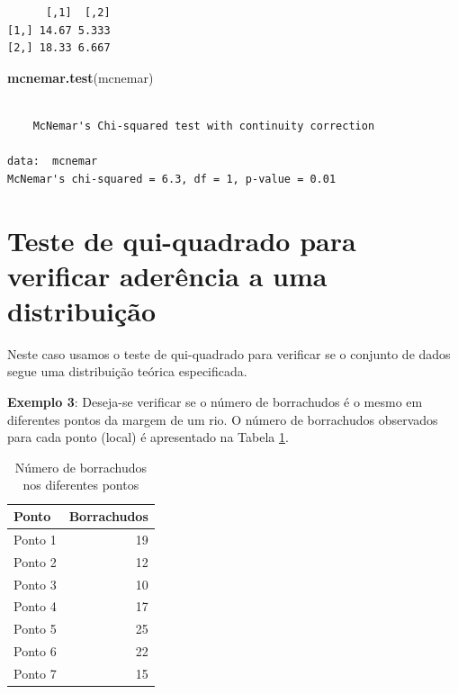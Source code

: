 \documentclass[12pt,brazil,]{book}
\newenvironment{Shaded}{\begin{snugshade}}{\end{snugshade}}
\newcommand{\KeywordTok}[1]{\textcolor[rgb]{0.13,0.29,0.53}{\textbf{#1}}}
\newcommand{\NormalTok}[1]{#1}
\begin{document}
\begin{verbatim}
      [,1]  [,2]
[1,] 14.67 5.333
[2,] 18.33 6.667
\end{verbatim}

\begin{Shaded}
\begin{Highlighting}[]
\KeywordTok{mcnemar.test}\NormalTok{(mcnemar)}
\end{Highlighting}
\end{Shaded}

\begin{verbatim}

    McNemar's Chi-squared test with continuity correction

data:  mcnemar
McNemar's chi-squared = 6.3, df = 1, p-value = 0.01
\end{verbatim}

\hypertarget{teste-de-qui-quadrado-para-verificar-aderencia-a-uma-distribuicao}{%
\section{Teste de qui-quadrado para verificar aderência a uma
distribuição}\label{teste-de-qui-quadrado-para-verificar-aderencia-a-uma-distribuicao}}

Neste caso usamos o teste de qui-quadrado para verificar se o conjunto
de dados segue uma distribuição teórica especificada.

\textbf{Exemplo 3}: Deseja-se verificar se o número de borrachudos é o
mesmo em diferentes pontos da margem de um rio. O número de borrachudos
observados para cada ponto (local) é apresentado na Tabela
\ref{tab:borrach}.

\begin{table}

\caption{\label{tab:borrach}Número de borrachudos nos diferentes pontos}
\centering
\begin{tabular}[t]{l|r}
\hline
Ponto & Borrachudos\\
\hline
Ponto 1 & 19\\
\hline
Ponto 2 & 12\\
\hline
Ponto 3 & 10\\
\hline
Ponto 4 & 17\\
\hline
Ponto 5 & 25\\
\hline
Ponto 6 & 22\\
\hline
Ponto 7 & 15\\
\hline
\end{tabular}
\end{table}
\end{document}

